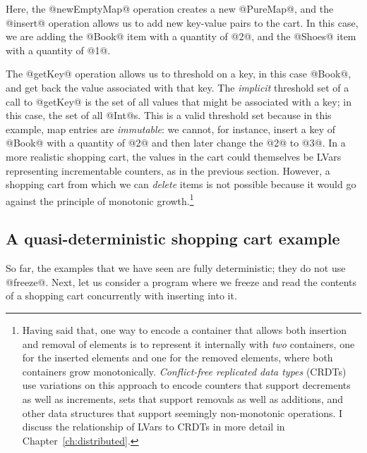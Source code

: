 \singlespacing

\doublespacing

Here, the @newEmptyMap@ operation creates a new @PureMap@,
and the @insert@ operation allows us to add new key-value pairs to the
cart.  In this case, we are adding the @Book@ item with a quantity of
@2@, and the @Shoes@ item with a quantity of @1@.

The @getKey@ operation allows us to threshold on a key, in this case
@Book@, and get back the value associated with that key.  The
\emph{implicit} threshold set of a call to @getKey@ is the set of all
values that might be associated with a key; in this case, the set of
all @Int@s.  This is a valid threshold set because in this example,
map entries are \emph{immutable}: we cannot, for instance, insert a
key of @Book@ with a quantity of @2@ and then later change the @2@ to
@3@.  In a more realistic shopping cart, the values in the cart could
themselves be LVars representing incrementable counters, as in the
previous section.  
However, a shopping cart from which we can \emph{delete} items is not
possible because it would go against the principle of monotonic
growth.\footnote{Having said that, one way to encode a container that
  allows both insertion and removal of elements is to represent it
  internally with \emph{two} containers, one for the inserted elements
  and one for the removed elements, where both containers grow
  monotonically.  \emph{Conflict-free replicated data types}
  (CRDTs)~\cite{crdts} use variations on this approach to encode
  counters that support decrements as well as increments, sets that
  support removals as well as additions, and other data structures
  that support seemingly non-monotonic operations.  I discuss the
  relationship of LVars to CRDTs in more detail in
  Chapter~\ref{ch:distributed}.}

\subsection{A quasi-deterministic shopping cart example}

So far, the examples that we have seen are fully deterministic; they
do not use @freeze@.  Next, let us consider a program where we freeze
and read the contents of a shopping cart concurrently with inserting
into it.

